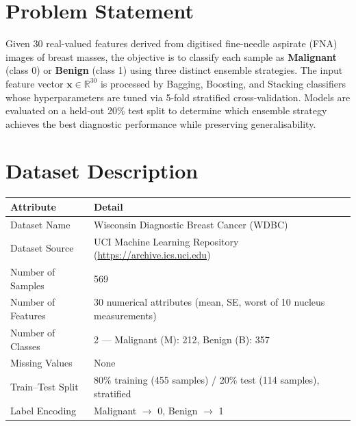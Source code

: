 \documentclass[12pt,a4paper]{article}
\begin{document}
\section{Problem Statement}
Given 30 real-valued features derived from digitised fine-needle aspirate (FNA) images of breast
masses, the objective is to classify each sample as \textbf{Malignant} (class 0) or \textbf{Benign}
(class 1) using three distinct ensemble strategies. The input feature vector
$\mathbf{x} \in \mathbb{R}^{30}$ is processed by Bagging, Boosting, and Stacking classifiers whose
hyperparameters are tuned via 5-fold stratified cross-validation. Models are evaluated on a held-out
20\% test split to determine which ensemble strategy achieves the best diagnostic performance while
preserving generalisability.

\section{Dataset Description}

\begin{longtable}{|p{5.5cm}|p{9cm}|}
\hline
\textbf{Attribute}      & \textbf{Detail} \\ \hline
Dataset Name            & Wisconsin Diagnostic Breast Cancer (WDBC) \\ \hline
Dataset Source          & UCI Machine Learning Repository (\url{https://archive.ics.uci.edu}) \\ \hline
Number of Samples       & 569 \\ \hline
Number of Features      & 30 numerical attributes (mean, SE, worst of 10 nucleus measurements) \\ \hline
Number of Classes       & 2 --- Malignant (M): 212, Benign (B): 357 \\ \hline
Missing Values          & None \\ \hline
Train--Test Split       & 80\% training (455 samples) / 20\% test (114 samples), stratified \\ \hline
Label Encoding          & Malignant $\rightarrow$ 0, Benign $\rightarrow$ 1 \\ \hline
\end{longtable}
\end{document}
